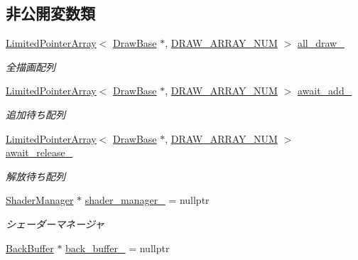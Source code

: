 \subsection*{非公開変数類}
\begin{DoxyCompactItemize}
\item 
\mbox{\hyperlink{class_limited_pointer_array}{Limited\+Pointer\+Array}}$<$ \mbox{\hyperlink{class_draw_base}{Draw\+Base}} $\ast$, \mbox{\hyperlink{class_draw_manager_ad4326cddcb1cc4cec198c4f8069b81f0}{D\+R\+A\+W\+\_\+\+A\+R\+R\+A\+Y\+\_\+\+N\+UM}} $>$ \mbox{\hyperlink{class_draw_manager_a328d73b404a5609d3e89a299362253fd}{all\+\_\+draw\+\_\+}}
\begin{DoxyCompactList}\small\item\em 全描画配列 \end{DoxyCompactList}\item 
\mbox{\hyperlink{class_limited_pointer_array}{Limited\+Pointer\+Array}}$<$ \mbox{\hyperlink{class_draw_base}{Draw\+Base}} $\ast$, \mbox{\hyperlink{class_draw_manager_ad4326cddcb1cc4cec198c4f8069b81f0}{D\+R\+A\+W\+\_\+\+A\+R\+R\+A\+Y\+\_\+\+N\+UM}} $>$ \mbox{\hyperlink{class_draw_manager_aa6a8468dd4469cde2cf162b91a5c1faf}{await\+\_\+add\+\_\+}}
\begin{DoxyCompactList}\small\item\em 追加待ち配列 \end{DoxyCompactList}\item 
\mbox{\hyperlink{class_limited_pointer_array}{Limited\+Pointer\+Array}}$<$ \mbox{\hyperlink{class_draw_base}{Draw\+Base}} $\ast$, \mbox{\hyperlink{class_draw_manager_ad4326cddcb1cc4cec198c4f8069b81f0}{D\+R\+A\+W\+\_\+\+A\+R\+R\+A\+Y\+\_\+\+N\+UM}} $>$ \mbox{\hyperlink{class_draw_manager_a59fa29ded26b3609545a04b5c6927824}{await\+\_\+release\+\_\+}}
\begin{DoxyCompactList}\small\item\em 解放待ち配列 \end{DoxyCompactList}\item 
\mbox{\hyperlink{class_shader_manager}{Shader\+Manager}} $\ast$ \mbox{\hyperlink{class_draw_manager_aac4cfc76f2953c30ed5eac54b544d0ad}{shader\+\_\+manager\+\_\+}} = nullptr
\begin{DoxyCompactList}\small\item\em シェーダーマネージャ \end{DoxyCompactList}\item 
\mbox{\hyperlink{class_back_buffer}{Back\+Buffer}} $\ast$ \mbox{\hyperlink{class_draw_manager_a53e3e9c0794c049fde69e7e5603df22f}{back\+\_\+buffer\+\_\+}} = nullptr

\end{DoxyCompactItemize}

